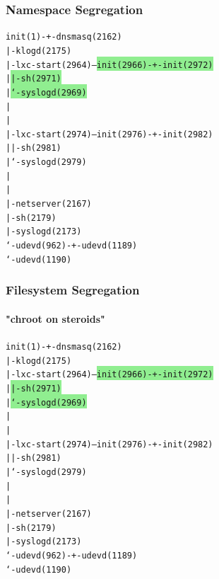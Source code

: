 \begin{frame}[fragile]
\frametitle{Namespace Segregation}
\begin{alltt}\footnotesize
init(1)-+-dnsmasq(2162)
        |-klogd(2175)
        |-lxc-start(2964)---\colorbox{LightGreen}{init(2966)-+-init(2972)    }
        |                   \colorbox{LightGreen}{              |-sh(2971)      }
        |                   \colorbox{LightGreen}{              `-syslogd(2969) }
        |                   
        |
        |-lxc-start(2974)---\colorbox{LightRed}{init(2976)-+-init(2982)    }
        |                   \colorbox{LightRed}{              |-sh(2981)      }
        |                   \colorbox{LightRed}{              `-syslogd(2979) }
        |                   
        |
        |-netserver(2167)
        |-sh(2179)
        |-syslogd(2173)
        `-udevd(962)-+-udevd(1189)
                     `-udevd(1190)
\end{alltt}\normalsize
\end{frame}

\begin{frame}[fragile]
\frametitle{Filesystem Segregation}
\framesubtitle{"chroot on steroids"}
\begin{alltt}\footnotesize
init(1)-+-dnsmasq(2162)
        |-klogd(2175)       
        |-lxc-start(2964)---\colorbox{LightGreen}{init(2966)-+-init(2972)    }
        |                   \colorbox{LightGreen}{              |-sh(2971)      }
        |                   \colorbox{LightGreen}{              `-syslogd(2969) }
        |                   
        |                   
        |-lxc-start(2974)---\colorbox{LightRed}{init(2976)-+-init(2982)    }
        |                   \colorbox{LightRed}{              |-sh(2981)      }
        |                   \colorbox{LightRed}{              `-syslogd(2979) }
        |                   
        |
        |-netserver(2167)
        |-sh(2179)
        |-syslogd(2173)
        `-udevd(962)-+-udevd(1189)
                     `-udevd(1190)
\end{alltt}\normalsize
\end{frame}

